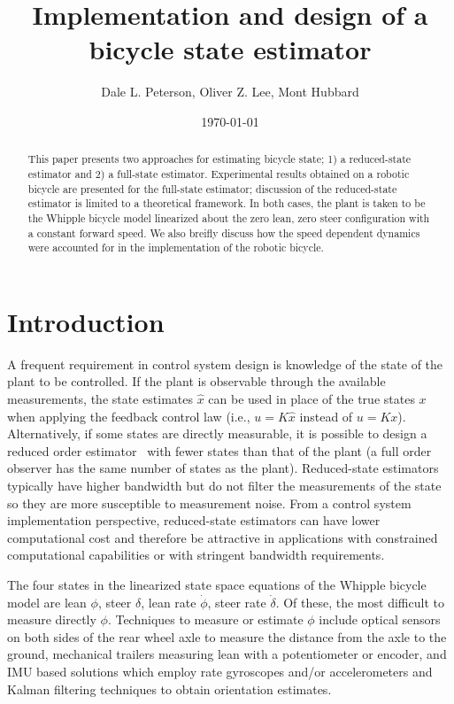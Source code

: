 \documentclass[letterpaper,11pt]{article}
\begin{document}
\title{Implementation and design of a bicycle state estimator}
\author{Dale L. Peterson, Oliver Z. Lee, Mont Hubbard}
\date{\today}
\maketitle

\begin{abstract}
This paper presents two approaches for estimating bicycle state; 1) a
reduced-state estimator and 2) a full-state estimator. Experimental results
obtained on a robotic bicycle are presented for the full-state estimator;
discussion of the reduced-state estimator is limited to a theoretical
framework. In both cases, the plant is taken to be the Whipple bicycle model
linearized about the zero lean, zero steer configuration with a constant
forward speed.  We also breifly discuss how the speed dependent dynamics were
accounted for in the implementation of the robotic bicycle.
\end{abstract}

\section{Introduction} \label{sec:introduction}
A frequent requirement in control system design is knowledge of the state of
the plant to be controlled. If the plant is observable through the available
measurements, the state estimates $\hat{x}$ can be used in place of the true
states $x$ when applying the feedback control law (i.e., $u=K\hat{x}$ instead
of $u=Kx$). Alternatively, if some states are directly measurable, it is
possible to design a reduced order estimator~\cite{Bryson1970} with fewer
states than that of the plant (a full order observer has the same number of
states as the plant).  Reduced-state estimators typically have higher bandwidth
but do not filter the measurements of the state so they are more susceptible to
measurement noise.  From a control system implementation perspective,
reduced-state estimators can have lower computational cost and therefore be
attractive in applications with constrained computational capabilities or with
stringent bandwidth requirements.

The four states in the linearized state space equations of the Whipple bicycle
model are lean $\phi$, steer $\delta$, lean rate $\dot{\phi}$, steer rate
$\dot{\delta}$.  Of these, the most difficult to measure directly $\phi$.
Techniques to measure or estimate $\phi$ include optical sensors on both sides
of the rear wheel axle to measure the distance from the axle to the ground,
mechanical trailers measuring lean with a potentiometer or encoder, and IMU
based solutions which employ rate gyroscopes and/or accelerometers and Kalman
filtering techniques to obtain orientation estimates\cite{Boniolo2008}.
\end{document}

